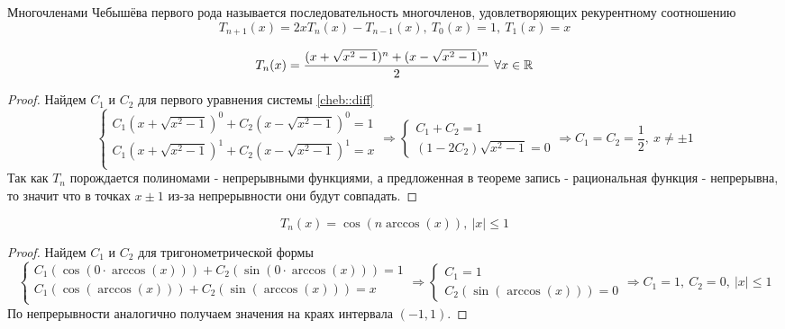 \begin{definition}
  Многочленами Чебышёва первого рода называется последовательность
  многочленов, удовлетворяющих рекурентному соотношению
  \[T_{n+1}(x)=2xT_n(x)-T_{n-1}(x),\ T_0(x)=1,\ T_1(x)=x\]
\end{definition}
\begin{theorem}
  \[T_n(x)=\frac{(x+\sqrt{x^2-1})^n+(x-\sqrt{x^2-1})^n}{2}\ \forall x\in\R\]
\end{theorem}
\begin{proof}
  Найдем $C_1$ и $C_2$ для первого уравнения системы \eqref{cheb::diff}
  \[\begin{cases}
      C_1(x+\sqrt{x^2-1})^0+C_2(x-\sqrt{x^2-1})^0=1 \\
      C_1(x+\sqrt{x^2-1})^1+C_2(x-\sqrt{x^2-1})^1=x \\
    \end{cases}\Rightarrow\begin{cases}
      C_1+C_2=1 \\
      (1-2C_2)\sqrt{x^2-1}=0
    \end{cases}\Rightarrow C_1=C_2=\frac{1}{2},\ x\neq\pm1\]
  Так как $T_n$ порождается полиномами - непрерывными функциями,
  а предложенная в теореме запись - рациональная функция - непрерывна,
  то значит что в точках $x\pm1$ из-за непрерывности они будут совпадать.
\end{proof}
\begin{theorem}
  \[T_n(x)=\cos(n\arccos(x)),\ |x|\leq1\]
\end{theorem}
\begin{proof}
  Найдем $C_1$ и $C_2$ для тригонометрической формы
  \[\begin{cases}
      C_1(\cos(0\cdot\arccos(x)))+C_2(\sin(0\cdot\arccos(x)))=1 \\
      C_1(\cos(\arccos(x)))+C_2(\sin(\arccos(x)))=x             \\
    \end{cases}\Rightarrow\begin{cases}
      C_1=1 \\
      C_2(\sin(\arccos(x)))=0
    \end{cases}\Rightarrow C_1=1,\ C_2=0,\ |x|\leq1\]
  По непрерывности аналогично получаем значения на краях интервала $(-1,1)$.
\end{proof}

